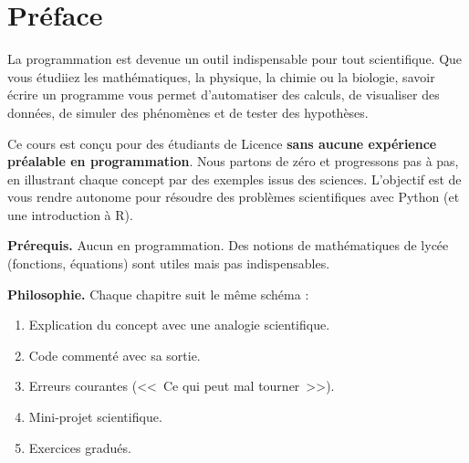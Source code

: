 \documentclass[12pt,a4paper,twoside]{book}
\theoremstyle{definition}
\theoremstyle{remark}
\begin{document}
\frontmatter
\begin{titlepage}
\end{titlepage}
\tableofcontents

\chapter*{Pr\'eface}

La programmation est devenue un outil indispensable pour tout scientifique. Que vous \'etudiiez les math\'ematiques, la physique, la chimie ou la biologie, savoir \'ecrire un programme vous permet d'automatiser des calculs, de visualiser des donn\'ees, de simuler des ph\'enom\`enes et de tester des hypoth\`eses.

\medskip
Ce cours est con\c{c}u pour des \'etudiants de Licence \textbf{sans aucune exp\'erience pr\'ealable en programmation}. Nous partons de z\'ero et progressons pas \`a pas, en illustrant chaque concept par des exemples issus des sciences. L'objectif est de vous rendre autonome pour r\'esoudre des probl\`emes scientifiques avec Python (et une introduction \`a R).

\medskip
\textbf{Pr\'erequis.} Aucun en programmation. Des notions de math\'ematiques de lyc\'ee (fonctions, \'equations) sont utiles mais pas indispensables.

\medskip
\textbf{Philosophie.} Chaque chapitre suit le m\^eme sch\'ema :
\begin{enumerate}
\item Explication du concept avec une analogie scientifique.
\item Code comment\'e avec sa sortie.
\item Erreurs courantes (<<~Ce qui peut mal tourner~>>).
\item Mini-projet scientifique.
\item Exercices gradu\'es.
\end{enumerate}
\end{document}
